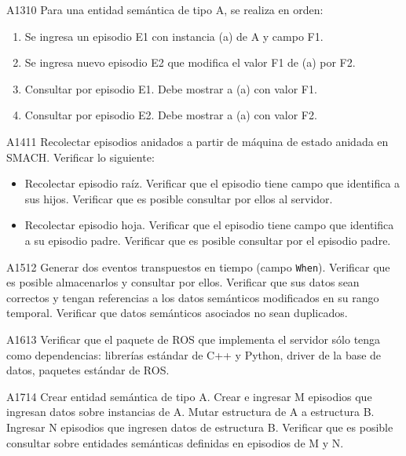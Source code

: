 \begin{def-validacion}{A}{13}{10}
	Para una entidad semántica de tipo A, se realiza en orden:
	\begin{enumerate}
		\item Se ingresa un episodio E1 con instancia (a) de A y campo F1.
		\item Se ingresa nuevo episodio E2 que modifica el valor F1 de (a) por F2.
		\item Consultar por episodio E1. Debe mostrar a (a) con valor F1.
		\item Consultar por episodio E2. Debe mostrar a (a) con valor F2.
	\end{enumerate}
\end{def-validacion}

\begin{def-validacion}{A}{14}{11}
	Recolectar episodios anidados a partir de máquina de estado anidada en SMACH. Verificar lo siguiente:
	\begin{itemize}
		\item Recolectar episodio raíz. Verificar que el episodio tiene campo que identifica a sus hijos. Verificar que es posible consultar por ellos al servidor.
		\item Recolectar episodio hoja. Verificar que el episodio tiene campo que identifica a su episodio padre. Verificar que es posible consultar por el episodio padre.
	\end{itemize}
\end{def-validacion}

\begin{def-validacion}{A}{15}{12}
	Generar dos eventos transpuestos en tiempo (campo \texttt{When}). Verificar que es posible almacenarlos y consultar por ellos. Verificar que sus datos sean correctos y tengan referencias a los datos semánticos modificados en su rango temporal. Verificar que datos semánticos asociados no sean duplicados.
\end{def-validacion}

\begin{def-validacion}{A}{16}{13}
	Verificar que el paquete de ROS que implementa el servidor sólo tenga como dependencias: librerías estándar de C++ y Python, driver de la base de datos, paquetes estándar de ROS.	
\end{def-validacion}


\begin{def-validacion}{A}{17}{14}
	Crear entidad semántica de tipo A. Crear e ingresar M episodios que ingresan datos sobre  instancias de A. Mutar estructura de A a estructura B. Ingresar N episodios que ingresen datos de estructura B. Verificar que es posible consultar sobre entidades semánticas definidas en episodios de M y N.
\end{def-validacion}


